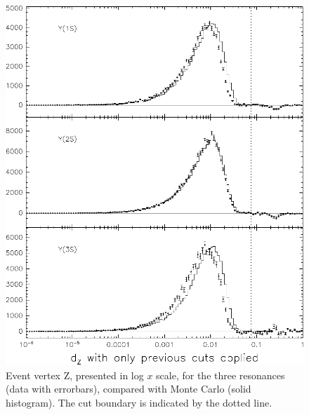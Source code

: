 \begin{figure}
  \includegraphics[width=\linewidth]{plots/efficiency_dz}
  \caption{\label{efficiency_dz} Event vertex Z, presented in log $x$
    scale, for the three resonances (data with errorbars), compared
    with Monte Carlo (solid histogram).  The cut boundary is indicated
    by the dotted line.}
\end{figure}

